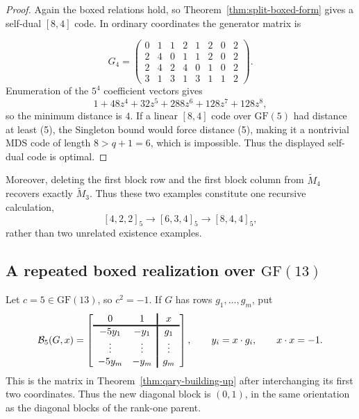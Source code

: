 \documentclass[12pt]{article}
\newcommand{\GF}[1]{\ensuremath{\mathrm{GF}(#1)}}
\begin{document}
\begin{proof}
Again the boxed relations hold, so Theorem~\ref{thm:split-boxed-form} gives a self-dual \([8,4]\) code. In ordinary coordinates the generator matrix is

\[
G_4= \left(
\begin{array}{cc|cccc|cc}
0&1&1&2&1&2&0&2\\
2&4&0&1&1&2&0&2\\
2&4&2&4&0&1&0&2\\
\hline
3&1&3&1&3&1&1&2
\end{array}
\right).
\]
Enumeration of the \(5^4\) coefficient vectors gives
\[
1+48z^4+32z^5+288z^6+128z^7+128z^8,
\]
so the minimum distance is \(4\).  If a linear \([8,4]\) code over
\(\GF{5}\) had distance at least (5), the Singleton bound would force
distance (5), making it a nontrivial MDS code of length \(8>q+1=6\),
which is impossible.  Thus the displayed self-dual code is optimal.
\end{proof}

Moreover, deleting the first block row and the first block column from
\(\widetilde M_4\) recovers exactly \(\widetilde M_3\).  Thus these two
examples constitute one recursive calculation,
\[
[4,2,2]_5\longrightarrow[6,3,4]_5
\longrightarrow[8,4,4]_5,
\]
rather than two unrelated existence examples.

\subsection{A repeated boxed realization over
\texorpdfstring{\(\GF{13}\)}{GF(13)}}

Let \(c=5\in\GF{13}\), so \(c^2=-1\).  If \(G\) has rows
\(g_1,\ldots,g_m\), put
\begin{equation}
\mathcal B_5(G,x)=
\left[
\begin{array}{cc!{\vrule width 1.2pt}c}
0&1&x\\
\noalign{\hrule height 1.2pt}
-5y_1&-y_1&g_1\\
\vdots&\vdots&\vdots\\
-5y_m&-y_m&g_m
\end{array}
\right],
\qquad y_i=x\cdot g_i,\qquad x\cdot x=-1.
\label{eq:gf13-repeated-box}
\end{equation}
This is the matrix in Theorem~\ref{thm:qary-building-up} after interchanging
its first two coordinates.  Thus the new diagonal block is \((0,1)\), in the
same orientation as the diagonal blocks of the rank-one parent.
\end{document}
